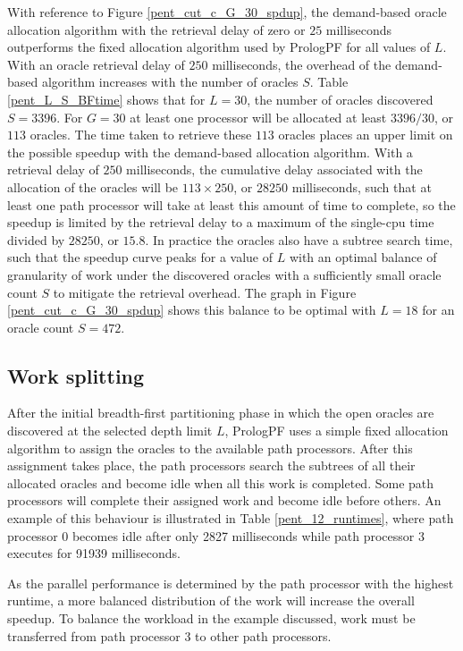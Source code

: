 With reference to Figure \ref{pent_cut_c_G_30_spdup}, the demand-based oracle allocation
algorithm with the retrieval delay of zero or $25$ milliseconds outperforms the fixed
allocation algorithm used by PrologPF for all values of $L$.  With an oracle retrieval
delay of $250$ milliseconds, the overhead of the demand-based algorithm increases with the
number of oracles $S$.  Table \ref{pent_L_S_BFtime} shows that for $L=30$, the number of
oracles discovered $S=3396$.  For $G=30$ at least one processor will be allocated at
least $3396/30$, or $113$ oracles.  
The time taken to retrieve these $113$ oracles places an upper limit on the possible
speedup with the demand-based allocation algorithm.
With a retrieval delay of $250$ milliseconds, the
cumulative delay associated with the allocation of the oracles will be $113\times 250$,
or $28250$ milliseconds, such that at least one path processor will take at least this amount
of time to complete, so the speedup is limited by the retrieval delay to a maximum of
the single-cpu time divided by $28250$, or $15.8$.  In practice the oracles also have
a subtree search time, such that the speedup curve peaks for a value of $L$ with an optimal
balance of granularity of work under the discovered oracles with a sufficiently small oracle
count $S$ to mitigate the retrieval overhead.  The graph in Figure \ref{pent_cut_c_G_30_spdup}
shows this balance to be optimal with $L=18$ for an oracle count $S=472$.

\subsection{Work splitting}
\label{bfp_work_splitting}

After the initial breadth-first partitioning phase in which the open oracles are
discovered at the selected depth limit $L$,  PrologPF uses a simple fixed allocation
algorithm to assign the oracles to the available path processors.  After this assignment
takes place, the path processors search the subtrees of all their allocated oracles
and become idle when all this work is completed.  Some path processors will complete
their assigned work and become idle before others.  An example of this behaviour is
illustrated in Table \ref{pent_12_runtimes}, where path processor 0 becomes idle after
only 2827 milliseconds while path processor 3 executes for 91939 milliseconds.

As the parallel performance is determined by the path processor with the highest runtime, a
more balanced distribution of the work will increase the overall speedup.  To balance the
workload in the example discussed, work must be transferred from path processor 3 to
other path processors.

